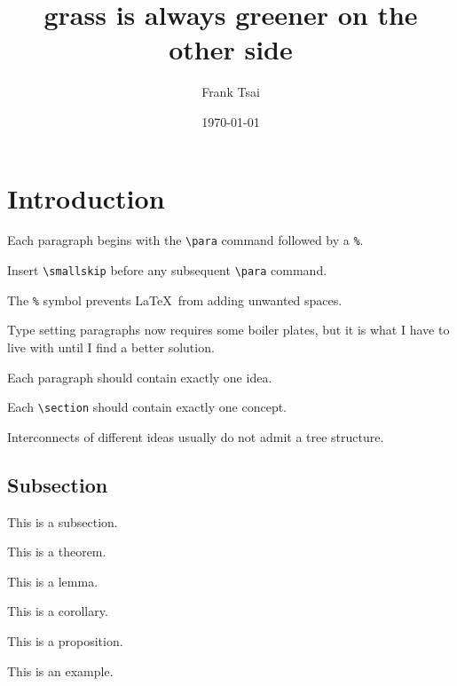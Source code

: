 \documentclass{zett}
\title{grass is always greener on the other side}
\author{Frank Tsai}
\date{\today}
\begin{document}
\maketitle
\tableofcontents

\section{Introduction}
\label{sec:introduction}

\para\label{para:the-para-command}%
Each paragraph begins with the \verb|\para| command followed by a \verb|%|.

\smallskip
\para%
Insert \verb|\smallskip| before any subsequent \verb|\para| command.

\smallskip
\para%
The \verb|%| symbol prevents \LaTeX~from adding unwanted spaces.

\smallskip
\para%
Type setting paragraphs now requires some boiler plates, but it is what I have to live with until I find a better solution.

\smallskip
\para%
Each paragraph should contain exactly one idea.

\smallskip
\para%
Each \verb|\section| should contain exactly one concept.

\smallskip
\para%
Interconnects of different ideas usually do not admit a tree structure.


\subsection{Subsection}
\label{sec:subsection}

\para%
This is a subsection.

\begin{theorem}
  This is a theorem.
\end{theorem}

\begin{lemma}
  This is a lemma.
\end{lemma}

\begin{corollary}
  This is a corollary.
\end{corollary}

\begin{proposition}
  This is a proposition.
\end{proposition}

\begin{example}
  This is an example.
\end{example}
\end{document}
